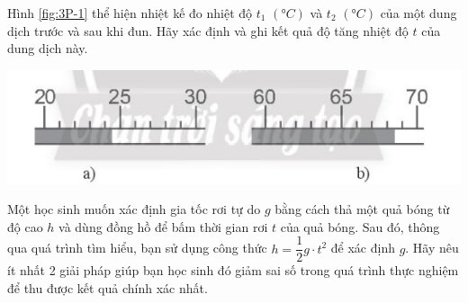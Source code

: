 \begin{ex}
	Hình \ref{fig:3P-1} thể hiện nhiệt kế đo nhiệt độ $t_1$ $\left(\si{\degree C}\right)$ và $t_2$ $\left(\si{\degree C}\right)$ của một dung dịch trước và sau khi đun. Hãy xác định và ghi kết quả độ tăng nhiệt độ $t$ của dung dịch này.
	\begin{center}
		\includegraphics[scale=0.5]{figs/G10Y25B2-2}
		\label{fig:3P-1}
	\end{center}
\end{ex}

\begin{ex}
	Một học sinh muốn xác định gia tốc rơi tự do $g$ bằng cách thả một quả bóng từ độ cao $h$ và dùng đồng hồ để bấm thời gian rơi $t$ của quả bóng. Sau đó, thông qua quá trình tìm hiểu, bạn sử dụng công thức $h=\dfrac{1}{2}g\cdot t^2$ để xác định $g$. Hãy nêu ít nhất 2 giải pháp giúp bạn học sinh đó giảm sai số trong quá trình thực nghiệm để thu được kết quả chính xác nhất.
\end{ex}

